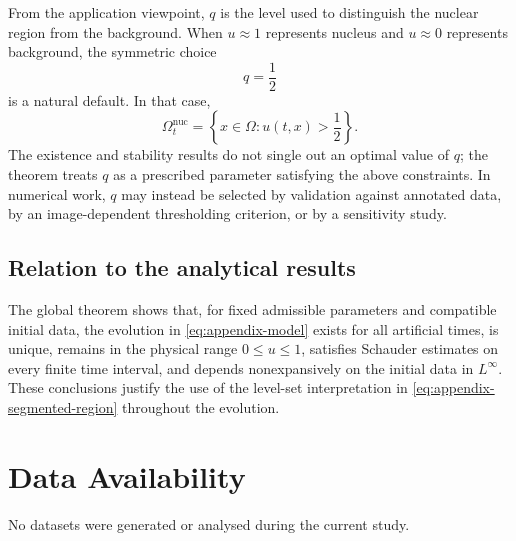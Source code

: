 \documentclass[11pt]{article}
\theoremstyle{remark}
\begin{document}
From the application viewpoint, $q$ is the level used to distinguish the nuclear region from the background.  When $u\approx1$ represents nucleus and $u\approx0$ represents background, the symmetric choice
\[
q=\frac12
\]
is a natural default.  In that case,
\begin{equation}\label{eq:appendix-segmented-region}
\Omega_t^{\mathrm{nuc}}
=
\left\{x\in\Omega:u(t,x)>\frac12\right\}.
\end{equation}
The existence and stability results do not single out an optimal value of $q$; the theorem treats $q$ as a prescribed parameter satisfying the above constraints.  In numerical work, $q$ may instead be selected by validation against annotated data, by an image-dependent thresholding criterion, or by a sensitivity study.

\subsection{Relation to the analytical results}

The global theorem shows that, for fixed admissible parameters and compatible initial data, the evolution in \eqref{eq:appendix-model} exists for all artificial times, is unique, remains in the physical range $0\le u\le1$, satisfies Schauder estimates on every finite time interval, and depends nonexpansively on the initial data in $L^\infty$.  These conclusions justify the use of the level-set interpretation in \eqref{eq:appendix-segmented-region} throughout the evolution.

\section*{Data Availability}

No datasets were generated or analysed during the current study.
\end{document}
